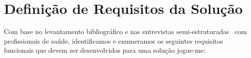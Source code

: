 %
%
%
%

\section{Definição de Requisitos da Solução}\label{section:requisitos_solucao}
Com base no levantamento bibliográfico e nas entrevistas semi-estruturadas~\cite{FLI04} com profissionais de saúde, identificamos e enumeramos os seguintes requisitos funcionais que devem ser desenvolvidos para uma solução \ac{jogue-me}:

